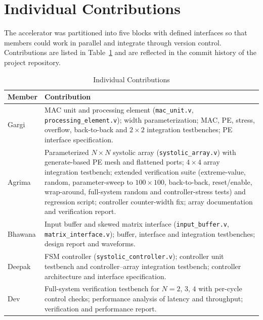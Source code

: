\documentclass[conference]{IEEEtran}
\begin{document}
\section{Individual Contributions}
The accelerator was partitioned into five blocks with defined interfaces so that members could
work in parallel and integrate through version control. Contributions are listed in
Table~\ref{tab:contrib} and are reflected in the commit history of the project repository.

\begin{table}[t]
\centering
\caption{Individual Contributions}
\label{tab:contrib}
\renewcommand{\arraystretch}{1.15}
\begin{tabular}{@{}>{\raggedright\arraybackslash}p{0.6in}>{\raggedright\arraybackslash}p{2.6in}@{}}
\toprule
Member & Contribution\\
\midrule
Gargi & MAC unit and processing element (\texttt{mac\_unit.v}, \texttt{processing\_element.v}); width parameterization; MAC, PE, stress, overflow, back-to-back and $2\times2$ integration testbenches; PE interface specification.\\
Agrima & Parameterized $N\times N$ systolic array (\texttt{systolic\_array.v}) with generate-based PE mesh and flattened ports; $4\times4$ array integration testbench; extended verification suite (extreme-value, random, parameter-sweep to $100\times100$, back-to-back, reset/enable, wrap-around, full-system random and controller-stress tests) and regression script; controller counter-width fix; array documentation and verification report.\\
Bhawana & Input buffer and skewed matrix interface (\texttt{input\_buffer.v}, \texttt{matrix\_interface.v}); buffer, interface and integration testbenches; design report and waveforms.\\
Deepak & FSM controller (\texttt{systolic\_controller.v}); controller unit testbench and controller--array integration testbench; controller architecture and interface specification.\\
Dev & Full-system verification testbench for $N=2$, $3$, $4$ with per-cycle control checks; performance analysis of latency and throughput; verification and performance report.\\
\bottomrule
\end{tabular}
\end{table}
\end{document}
